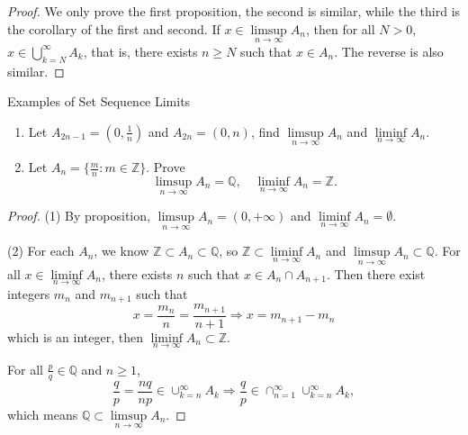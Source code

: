 \begin{proof}
  We only prove the first proposition, the second is similar,
  while the third is the corollary of the first and second.
  If $x \in \limsup\limits_{n \rightarrow \infty}A_n$,
  then for all $N > 0$, $x \in \bigcup \limits_{k = N}^{\infty}A_k$,
  that is, there exists $n \geq N$ such that $x \in A_n$.
  The reverse is also similar.
\end{proof}

\begin{example}{Examples of Set Sequence Limits}{}
  \begin{enumerate}
  \item Let $A_{2n-1} = (0, \frac{1}{n})$ and $A_{2n} = (0, n)$, find
    $\limsup \limits_{n \rightarrow \infty} A_n$ and $\liminf \limits_{n \rightarrow \infty} A_n$.
  \item Let $A_n = \{\frac{m}{n}: m \in \mathbb{Z}\}$. Prove
    \begin{equation}
      \limsup \limits_{n \rightarrow \infty} A_n = \mathbb{Q}, \quad
      \liminf \limits_{n \rightarrow \infty} A_n = \mathbb{Z}.
    \end{equation}
  \end{enumerate}
\end{example}

\begin{proof}
  (1) By proposition, $\limsup \limits_{n \rightarrow \infty} A_n = (0, +\infty)$ and
  $\liminf \limits_{n \rightarrow \infty} A_n = \emptyset$.

  (2) For each $A_n$, we know $\mathbb{Z} \subset A_n \subset \mathbb{Q}$, so
  $\mathbb{Z} \subset \liminf \limits_{n \rightarrow \infty} A_n$ and
  $\limsup \limits_{n \rightarrow \infty} A_n \subset \mathbb{Q}$.
  For all $x \in \liminf \limits_{n \rightarrow \infty} A_n$, there exists $n$
  such that $x \in A_n \cap A_{n+1}$.
  Then there exist integers $m_n$ and $m_{n+1}$ such that
  \begin{equation}
    x = \frac{m_n}{n} = \frac{m_{n+1}}{n+1} \Rightarrow x = m_{n+1} - m_n
  \end{equation}
  which is an integer, then $\liminf \limits_{n \rightarrow \infty} A_n \subset \mathbb{Z}$.

  For all $\frac{p}{q} \in \mathbb{Q}$ and $n \geq 1$,
  \begin{equation}
    \frac{q}{p} = \frac{nq}{np} \in \cup _{k = n}^{\infty} A_k
    \Rightarrow
    \frac{q}{p} \in \cap _{n = 1}^{\infty} \cup _{k = n}^{\infty}A_k,
  \end{equation}
  which means $\mathbb{Q} \subset \limsup \limits_{n \rightarrow \infty}A_n$.
\end{proof}

